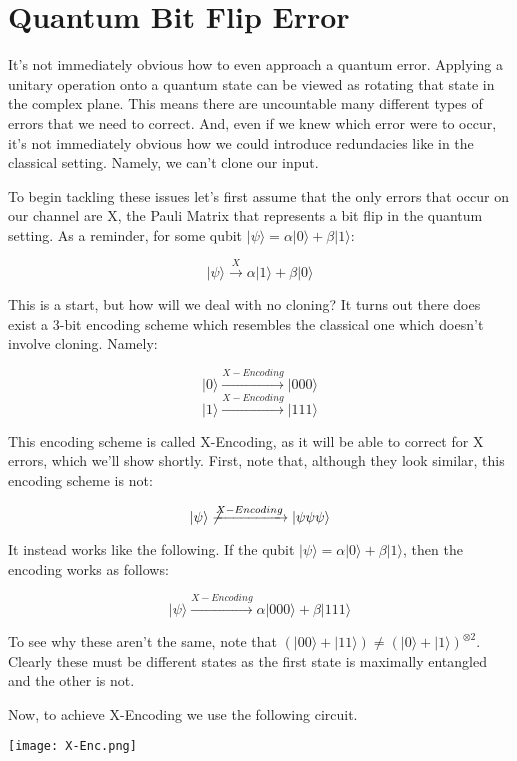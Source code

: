 \documentclass[11pt]{article}
\newcommand{\ket}[1]{\lvert #1 \rangle}
\begin{document}
\section{Quantum Bit Flip Error}

It's not immediately obvious how to even approach a quantum error. Applying a unitary operation onto a quantum state can be viewed as rotating that state in the complex plane. This means there are uncountable many different types of errors that we need to correct. And, even if we knew which error were to occur, it's not immediately obvious how we could introduce redundacies like in the classical setting. Namely, we can't clone our input. 

To begin tackling these issues let's first assume that the only errors that occur on our channel are X, the Pauli Matrix that represents a bit flip in the quantum setting. As a reminder, for some qubit $\ket{\psi} = \alpha\ket{0} +  \beta\ket{1}$:

{
\[\ket{\psi} \xrightarrow{X} \alpha\ket{1} + \beta\ket{0} \]
}

This is a start, but how will we deal with no cloning? It turns out there does exist a 3-bit encoding scheme which resembles the classical one which doesn't involve cloning. Namely:

{
\[\ket0 \xrightarrow{X-Encoding} \ket{000} \]
\[\ket1 \xrightarrow{X-Encoding} \ket{111} \]
}

This encoding scheme is called X-Encoding, as it will be able to correct for X errors, which we'll show shortly. First, note that, although they look similar, this encoding scheme is not: 

{
\[\ket{\psi} \not\xrightarrow{X-Encoding} \ket{\psi\psi\psi}\]
}

It instead works like the following. If the qubit $\ket{\psi} = \alpha\ket{0} +  \beta\ket{1}$, then the encoding works as follows:

{
\[\ket{\psi} \xrightarrow{X-Encoding} \alpha\ket{000} +  \beta\ket{111}\]
}

To see why these aren't the same, note that $(\ket{00} + \ket{11}) \neq (\ket0 + \ket1)^{\otimes2}$. Clearly these must be different states as the first state is maximally entangled and the other is not. 

Now, to achieve X-Encoding we use the following circuit.

{
\centering
\texttt{[image: X-Enc.png]}
\label{fig:Grammar}
\par 
}
\end{document}
